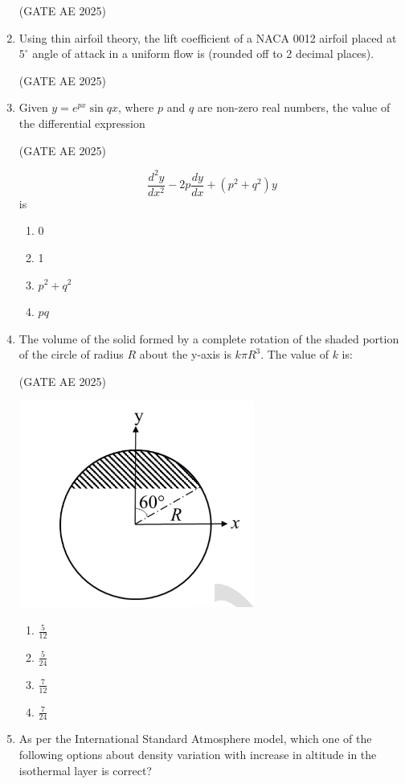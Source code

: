 \documentclass[journal,12pt,onecolumn]{IEEEtran}
\theoremstyle{remark}
\begin{document}
\begin{flushleft}
\begin{enumerate}
\hfill (GATE AE 2025)

\item Using thin airfoil theory, the lift coefficient of a NACA 0012 airfoil placed at $5^\circ$ angle of attack in a uniform flow is \underline{\hspace{3cm}} (rounded off to 2 decimal places).

\hfill (GATE AE 2025)

\item  Given $y = e^{px} \sin qx$, where $p$ and $q$ are non-zero real numbers, the value of the differential expression

\hfill (GATE AE 2025)

\[
\frac{d^2y}{dx^2} - 2p \frac{dy}{dx} + (p^2 + q^2)y
\]
is
\begin{enumerate}
    \item 0
    \item 1
    \item $p^2 + q^2$
    \item $pq$
\end{enumerate}

\item  The volume of the solid formed by a complete rotation of the shaded portion of the circle of radius $R$ about the y-axis is $k \pi R^3$. The value of $k$ is:

\hfill (GATE AE 2025)

\begin{center}
\includegraphics[width=0.35\columnwidth]{figs/37.png}
\end{center}

\begin{enumerate}
   \item $\frac{5}{12}$
    \item $\frac{5}{24}$
    \item $\frac{7}{12}$
    \item $\frac{7}{24}$
\end{enumerate}
   
\item As per the International Standard Atmosphere model, which one of the following options about density variation with increase in altitude in the isothermal layer is correct?


\end{enumerate}
\end{flushleft}
\end{document}
